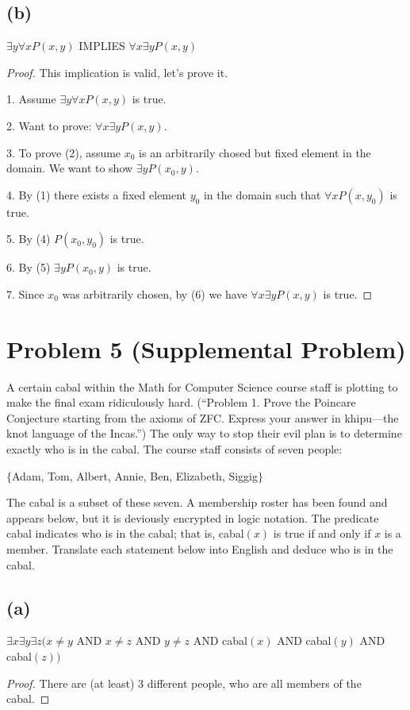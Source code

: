 \documentclass[14pt]{extarticle}
\begin{document}
\subsection{(b)}
$\exists y \forall x P(x, y)$ IMPLIES $\forall x \exists y P(x, y)$
\begin{proof}
This implication is valid, let's prove it.

1. Assume $\exists y \forall x P(x, y)$ is true. 

2. Want to prove: $\forall x \exists y P(x, y)$.

3. To prove (2), assume $x_0$ is an arbitrarily chosed but fixed element in the domain. We want to show $\exists y P(x_0, y)$.

4. By (1) there exists a fixed element $y_0$ in the domain such that $\forall x P(x, y_0)$ is true.

5. By (4) $P(x_0, y_0)$ is true.

6. By (5) $\exists y P(x_0, y)$ is true.

7. Since $x_0$ was arbitrarily chosen, by (6) we have $\forall x \exists y P(x, y)$ is true.
\end{proof}

\section{Problem 5 (Supplemental Problem)}
A certain cabal within the Math for Computer Science course staff is plotting to make the final exam ridiculously hard. (“Problem 1. Prove the Poincare Conjecture starting from the axioms of ZFC. Express your answer in khipu—the knot language of the Incas.”) The only way to stop their evil plan is to determine exactly who is in the cabal. The course staff consists of seven people:

\begin{center}
$\{$Adam, Tom, Albert, Annie, Ben, Elizabeth, Siggig$\}$
\end{center}

The cabal is a subset of these seven. A membership roster has been found and appears below, but it is deviously encrypted in logic notation. The predicate cabal indicates who is in the cabal; that is, cabal$(x)$ is true if and only if $x$ is a member. Translate each statement below into English and deduce who is in the cabal.

\subsection{(a)}
$\exists x \exists y \exists z(x \neq y$ AND $x \neq z$ AND $y \neq z$ AND cabal$(x)$ AND cabal$(y)$ AND cabal$(z))$
\begin{proof}
There are (at least) 3 different people, who are all members of the cabal.
\end{proof}
\end{document}
